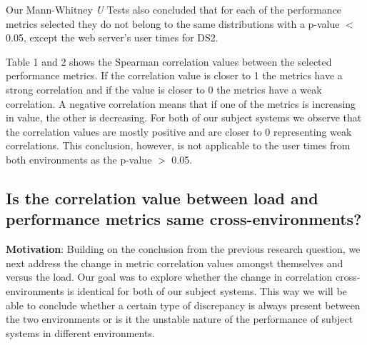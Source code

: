 Our Mann-Whitney \textit{U} Tests also concluded that for each of the performance metrics selected they do not belong to the same distributions with a p-value $<$ 0.05, except the web server's user times for DS2.

Table 1 and 2 shows the Spearman correlation values between the selected performance metrics. If the correlation value is closer to 1 the metrics have a strong correlation and if the value is closer to 0 the metrics have a weak correlation. A negative correlation means that if one of the metrics is increasing in value, the other is decreasing. For both of our subject systems we observe that the correlation values are mostly positive and are closer to 0 representing weak correlations. This conclusion, however, is not applicable to the user times from both environments as the p-value $>$ 0.05.

\subsection{\textbf{Is the correlation value between load and performance metrics same cross-environments?}}

\textbf{Motivation}: Building on the conclusion from the previous research question, we next address the change in metric correlation values amongst themselves and versus the load. Our goal was to explore whether the change in correlation cross-environments is identical for both of our subject systems. This way we will be able to conclude whether a certain type of discrepancy is always present between the two environments or is it the unstable nature of the performance of subject systems in different environments. 




